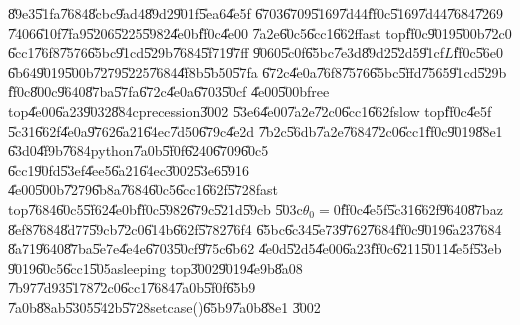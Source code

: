 \U{89e3}\U{51fa}\U{7684}\U{8cbc}\U{9ad4}\U{89d2}\U{901f}\U{5ea6}\U{4e5f}%
\U{6703}\U{6709}\U{5169}\U{7d44}\U{ff0c}\U{5169}\U{7d44}\U{7684}\U{7269}%
\U{7406}\U{610f}\U{7fa9}\U{5206}\U{5225}\U{5982}\U{4e0b}\U{ff0c}\U{4e00}%
\U{7a2e}\U{60c5}\U{6cc1}\U{662f}fast top\U{ff0c}\U{9019}\U{500b}\U{72c0}%
\U{6cc1}\U{76f8}\U{7576}\U{65bc}\U{91cd}\U{529b}\U{7684}\U{5f71}\U{97ff}%
\U{9060}\U{5c0f}\U{65bc}\U{7e3d}\U{89d2}\U{52d5}\U{91cf}$L$\U{ff0c}\U{56e0}%
\U{6b64}\U{9019}\U{500b}\U{7279}\U{5225}\U{7684}\U{4f8b}\U{5b50}\U{57fa}%
\U{672c}\U{4e0a}\U{76f8}\U{7576}\U{65bc}\U{5ffd}\U{7565}\U{91cd}\U{529b}%
\U{ff0c}\U{800c}\U{9640}\U{87ba}\U{57fa}\U{672c}\U{4e0a}\U{6703}\U{50cf}%
\U{4e00}\U{500b}free top\U{4e00}\U{6a23}\U{9032}\U{884c}precession\U{3002}%
\U{53e6}\U{4e00}\U{7a2e}\U{72c0}\U{6cc1}\U{662f}slow top\U{ff0c}\U{4e5f}%
\U{5c31}\U{662f}\U{4e0a}\U{9762}\U{6a21}\U{64ec}\U{7d50}\U{679c}\U{4e2d}%
\U{7b2c}\U{56db}\U{7a2e}\U{7684}\U{72c0}\U{6cc1}\U{ff0c}\U{9019}\U{88e1}%
\U{63d0}\U{4f9b}\U{7684}python\U{7a0b}\U{5f0f}\U{6240}\U{6709}\U{60c5}%
\U{6cc1}\U{90fd}\U{53ef}\U{4ee5}\U{6a21}\U{64ec}\U{3002}\U{53e6}\U{5916}%
\U{4e00}\U{500b}\U{7279}\U{6b8a}\U{7684}\U{60c5}\U{6cc1}\U{662f}\U{5728}fast
top\U{7684}\U{60c5}\U{5f62}\U{4e0b}\U{ff0c}\U{5982}\U{679c}\U{521d}\U{59cb}%
\U{503c}$\theta _{0}=0$\U{ff0c}\U{4e5f}\U{5c31}\U{662f}\U{9640}\U{87ba}z%
\U{8ef8}\U{7684}\U{8d77}\U{59cb}\U{72c0}\U{614b}\U{662f}\U{5782}\U{76f4}%
\U{65bc}\U{6c34}\U{5e73}\U{9762}\U{7684}\U{ff0c}\U{9019}\U{6a23}\U{7684}%
\U{8a71}\U{9640}\U{87ba}\U{5e7e}\U{4e4e}\U{6703}\U{50cf}\U{975c}\U{6b62}%
\U{4e0d}\U{52d5}\U{4e00}\U{6a23}\U{ff0c}\U{6211}\U{5011}\U{4e5f}\U{53eb}%
\U{9019}\U{60c5}\U{6cc1}\U{505a}sleeping top\U{3002}\U{9019}\U{4e9b}\U{8a08}%
\U{7b97}\U{7d93}\U{5178}\U{72c0}\U{6cc1}\U{7684}\U{7a0b}\U{5f0f}\U{65b9}%
\U{7a0b}\U{88ab}\U{5305}\U{542b}\U{5728}setcase()\U{65b9}\U{7a0b}\U{88e1}%
\U{3002}

\bigskip

